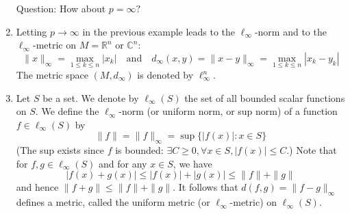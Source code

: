 \documentclass[a4paper]{article}
\begin{document}
\begin{example}
\begin{enumerate}
        Question: How about $p=\infty ?$
        \item Letting $p \rightarrow \infty$ in the previous example leads to the $\ell_{\infty}$-norm and to the $\ell_{\infty}$-metric on $M=\mathbb{R}^{n}$ or $\mathbb{C}^{n}:$
        \[
        \|x\|_{\infty}=\max _{1 \leqslant k \leqslant n}\left|x_{k}\right|\quad \text {and}\quad d_{\infty}(x, y)=\|x-y\|_{\infty}=\max _{1 \leqslant k \leqslant n}\left|x_{k}-y_{k}\right|
        \]
        The metric space $\left(M, d_{\infty}\right)$ is denoted by $\ell_{\infty}^{n}$.
        \item Let $S$ be a set. We denote by $\ell_{\infty}(S)$ the set of all bounded scalar functions on $S$. We define the $\ell_{\infty}$-norm (or uniform norm, or sup norm) of a function $f \in \ell_{\infty}(S)$ by
        \[
        \|f\|=\|f\|_{\infty}=\sup \{|f(x)|: x \in S\}
        \]
        (The sup exists since $f$ is bounded: $\exists C \geqslant 0, \forall x \in S,|f(x)| \leqslant C$.) Note that for $f, g \in \ell_{\infty}(S)$ and for any $x \in S$, we have
        \[
        |f(x)+g(x)| \leqslant|f(x)|+|g(x)| \leqslant\|f\|+\|g\|
        \]
        and hence $\|f+g\| \leqslant\|f\|+\|g\|$. It follows that $d(f, g)=\|f-g\|_{\infty}$ defines a metric, called the uniform metric (or $\ell_{\infty}$-metric) on $\ell_{\infty}(S)$.
        

\end{enumerate}
\end{example}
\end{document}
